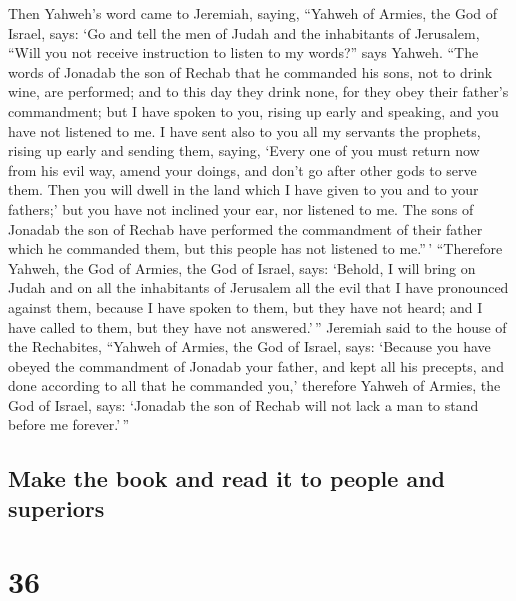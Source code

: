  Then Yahweh's word came to Jeremiah, saying,
 ``Yahweh of Armies, the God of Israel, says: `Go and
tell the men of Judah and the inhabitants of Jerusalem, ``Will you not
receive instruction to listen to my words?'' says Yahweh.
 ``The words of Jonadab the son of Rechab that he
commanded his sons, not to drink wine, are performed; and to this day
they drink none, for they obey their father's commandment; but I have
spoken to you, rising up early and speaking, and you have not listened
to me.  I have sent also to you all my servants the
prophets, rising up early and sending them, saying, `Every one of you
must return now from his evil way, amend your doings, and don't go after
other gods to serve them. Then you will dwell in the land which I have
given to you and to your fathers;' but you have not inclined your ear,
nor listened to me.  The sons of Jonadab the son of
Rechab have performed the commandment of their father which he commanded
them, but this people has not listened to me.''\,' 
``Therefore Yahweh, the God of Armies, the God of Israel, says: `Behold,
I will bring on Judah and on all the inhabitants of Jerusalem all the
evil that I have pronounced against them, because I have spoken to them,
but they have not heard; and I have called to them, but they have not
answered.'\,''  Jeremiah said to the house of the
Rechabites, ``Yahweh of Armies, the God of Israel, says: `Because you
have obeyed the commandment of Jonadab your father, and kept all his
precepts, and done according to all that he commanded you,'
 therefore Yahweh of Armies, the God of Israel, says:
`Jonadab the son of Rechab will not lack a man to stand before me
forever.'\,''

\hypertarget{make-the-book-and-read-it-to-people-and-superiors}{%
\subsection{Make the book and read it to people and
superiors}\label{make-the-book-and-read-it-to-people-and-superiors}}

\hypertarget{section-35}{%
\section{36}\label{section-35}}

